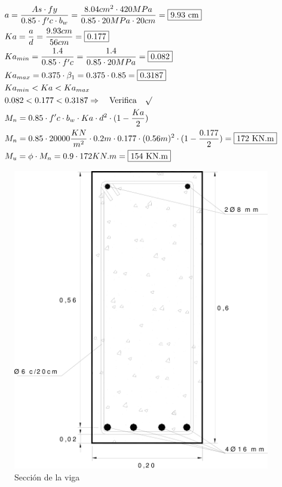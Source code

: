 \begin{enumerate}
\begin{align*}
& a = \frac{As \cdot fy}{0.85 \cdot f'c \cdot b_w} = \frac{8.04 cm^2 \cdot 420MPa}{0.85 \cdot 20MPa \cdot 20 cm} = \framebox{9.93 cm}\\
& Ka = \frac{a}{d} = \frac{9.93 cm}{56 cm} = \framebox{0.177}\\
& Ka_{min}= \frac{1.4}{0.85 \cdot f'c} = \frac{1.4}{0.85 \cdot 20MPa} = \framebox{0.082}\\
& Ka_{max}= 0.375 \cdot \beta_1 = 0.375 \cdot 0.85 = \framebox{0.3187}\\
& Ka_{min} < Ka < Ka_{max}\\
& 0.082 < 0.177 < 0.3187 \Rightarrow \quad \text{Verifica} \quad \surd\\
& M_n = 0.85 \cdot f'c \cdot b_w \cdot Ka \cdot d^2 \cdot (1- \frac{Ka}{2})\\
& M_n = 0.85 \cdot 20000 \frac{KN}{m^2} \cdot 0.2m \cdot 0.177 \cdot (0.56 m)^2 \cdot (1- \frac{0.177}{2}) = \framebox{172 KN.m}\\
& M_u = \phi \cdot M_n = 0.9 \cdot 172 KN.m = \framebox{154 KN.m}
\end{align*}

\begin{figure}[H]
\begin{center}
     \includegraphics[scale = 0.9]{chapters/chapter_1/images/figura2.png}
     \caption{Sección de la viga}
\end{center}
\end{figure}

\end{enumerate}